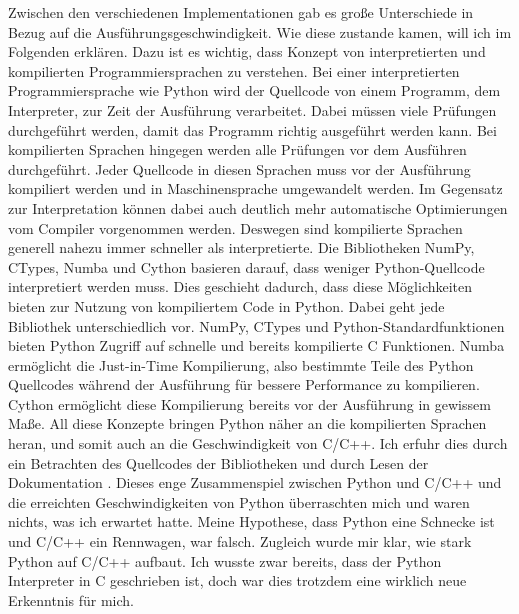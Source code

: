 \documentclass[11pt,a4paper]{article}
\begin{document}
Zwischen den verschiedenen Implementationen gab es große Unterschiede in Bezug auf die
Ausführungsgeschwindigkeit. Wie diese zustande kamen, will ich im Folgenden erklären.
Dazu ist es wichtig, dass Konzept von interpretierten und kompilierten
Programmiersprachen zu verstehen. Bei einer interpretierten Programmiersprache wie
Python wird der Quellcode von einem Programm, dem Interpreter, zur Zeit der Ausführung verarbeitet.
Dabei müssen viele Prüfungen durchgeführt werden, damit das Programm richtig ausgeführt werden kann.
Bei kompilierten Sprachen hingegen werden alle Prüfungen vor dem Ausführen durchgeführt.
Jeder Quellcode in diesen Sprachen muss vor der Ausführung kompiliert werden und in
Maschinensprache umgewandelt werden. Im Gegensatz zur Interpretation können dabei auch deutlich
mehr automatische Optimierungen vom Compiler vorgenommen werden.
Deswegen sind kompilierte Sprachen generell nahezu immer schneller als interpretierte.
Die Bibliotheken NumPy, CTypes, Numba und Cython basieren darauf, dass weniger Python-Quellcode
interpretiert werden muss. Dies geschieht dadurch, dass diese Möglichkeiten bieten zur
Nutzung von kompiliertem Code in Python.
Dabei geht jede Bibliothek unterschiedlich vor.
NumPy, CTypes und Python-Standardfunktionen bieten Python Zugriff auf schnelle und
bereits kompilierte C Funktionen.
Numba ermöglicht die Just-in-Time Kompilierung, also bestimmte Teile des Python Quellcodes
während der Ausführung für bessere Performance zu kompilieren.
Cython ermöglicht diese Kompilierung bereits vor der Ausführung in gewissem Maße.
All diese Konzepte bringen Python näher an die kompilierten Sprachen heran, und somit
auch an die Geschwindigkeit von C/C++. Ich erfuhr dies durch ein Betrachten des Quellcodes
der Bibliotheken und durch Lesen der Dokumentation \cite{pythonsource}
\cite{cythondocsnumpy} \cite{numbadoc} \cite{numpysource}.
Dieses enge Zusammenspiel zwischen Python und C/C++ und die erreichten Geschwindigkeiten
von Python überraschten mich und waren nichts, was ich erwartet hatte. Meine Hypothese,
dass Python eine Schnecke ist und C/C++ ein Rennwagen, war falsch.
Zugleich wurde mir klar, wie stark Python auf C/C++ aufbaut. Ich wusste zwar bereits,
dass der Python Interpreter in C geschrieben ist, doch war dies trotzdem eine wirklich
neue Erkenntnis für mich.
\end{document}
